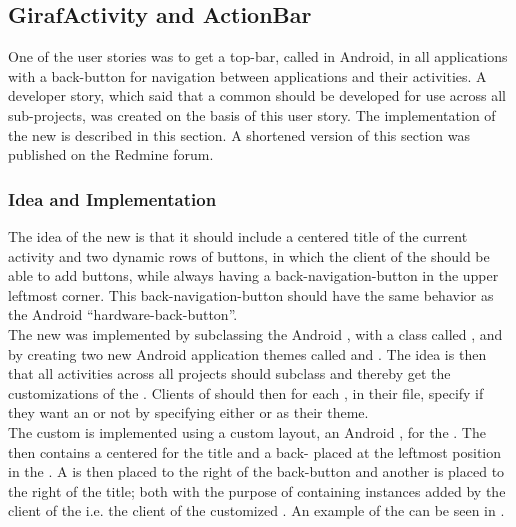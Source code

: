 \subsection{GirafActivity and ActionBar}
\label{sec:giraf_activity_actionbar}

One of the user stories was to get a top-bar, called  in Android, in all applications with a back-button for navigation between applications and their activities. A developer story, which said that a common  should be developed for use across all sub-projects, was created on the basis of this user story. The implementation of the new \giraf {} is described in this section. A shortened version of this section was published on the \giraf Redmine forum\parencite{redmine}.

\subsubsection{Idea and Implementation}

The idea of the new  is that it should include a centered title of the current activity and two dynamic rows of \giraf buttons, in which the client of the  should be able to add buttons, while always having a back-navigation-button in the upper leftmost corner. This back-navigation-button should have the same behavior as the Android ``hardware-back-button''.\\

The new  was implemented by subclassing the Android , with a class called , and by creating two new Android application themes called  and . The idea is then that all activities across all projects should subclass  and thereby get the customizations of the . Clients of  should then for each , in their  file, specify if they want an  or not by specifying either  or  as their theme.\\

The custom  is implemented using a custom layout, an Android , for the . The  then contains a centered  for the title and a back- placed at the leftmost position in the . A  is then placed to the right of the back-button and another  is placed to the right of the title; both with the purpose of containing  instances added by the client of the  i.e. the client of the customized . An example of the  can be seen in . \\

